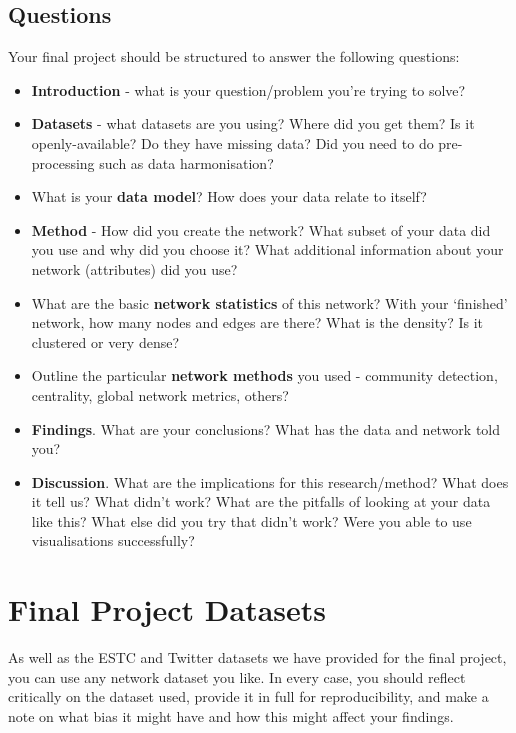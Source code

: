 \documentclass[
]{book}
\begin{document}
\hypertarget{questions}{%
\subsection{Questions}\label{questions}}

Your final project should be structured to answer the following questions:

\begin{itemize}
\item
  \textbf{Introduction} - what is your question/problem you're trying to solve?
\item
  \textbf{Datasets} - what datasets are you using? Where did you get them? Is it openly-available? Do they have missing data? Did you need to do pre-processing such as data harmonisation?
\item
  What is your \textbf{data model}? How does your data relate to itself?
\item
  \textbf{Method} - How did you create the network? What subset of your data did you use and why did you choose it? What additional information about your network (attributes) did you use?
\item
  What are the basic \textbf{network statistics} of this network? With your `finished' network, how many nodes and edges are there? What is the density? Is it clustered or very dense?
\item
  Outline the particular \textbf{network methods} you used - community detection, centrality, global network metrics, others?
\item
  \textbf{Findings}. What are your conclusions? What has the data and network told you?
\item
  \textbf{Discussion}. What are the implications for this research/method? What does it tell us? What didn't work? What are the pitfalls of looking at your data like this? What else did you try that didn't work? Were you able to use visualisations successfully?
\end{itemize}

\hypertarget{final-project-datasets}{%
\section{Final Project Datasets}\label{final-project-datasets}}

As well as the ESTC and Twitter datasets we have provided for the final project, you can use any network dataset you like. In every case, you should reflect critically on the dataset used, provide it in full for reproducibility, and make a note on what bias it might have and how this might affect your findings.
\end{document}
